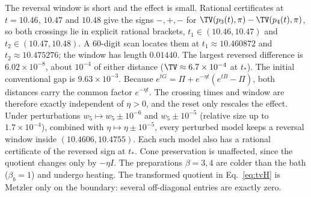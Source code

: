 The reversal window is short and the effect is small. Rational certificates at $t=10.46$, $10.47$ and $10.48$ give the signs $-,+,-$ for $\TV(p_3(t),\pi)-\TV(p_4(t),\pi)$, so both crossings lie in explicit rational brackets, $t_1\in(10.46,10.47)$ and $t_2\in(10.47,10.48)$. A 60-digit scan locates them at $t_1\approx10.460872$ and $t_2\approx10.475276$; the window has length $0.01440$. The largest reversed difference is $6.02\times10^{-8}$, about $10^{-4}$ of either distance ($\TV\approx6.7\times10^{-4}$ at $t_*$). The initial conventional gap is $9.63\times10^{-3}$. Because $e^{tG}=\Pi+e^{-\eta t}(e^{tB}-\Pi)$, both distances carry the common factor $e^{-\eta t}$. The crossing times and window are therefore exactly independent of $\eta>0$, and the reset only rescales the effect. Under perturbations $w_5\mapsto w_5\pm10^{-6}$ and $w_5\pm10^{-5}$ (relative size up to $1.7\times10^{-4}$), combined with $\eta\mapsto\eta\pm10^{-5}$, every perturbed model keeps a reversal window inside $(10.4606,10.4755)$. Each such model also has a rational certificate of the reversed sign at $t_*$. Cone preservation is unaffected, since the quotient changes only by $-\eta I$. The preparations $\beta=3,4$ are colder than the bath ($\beta_b=1$) and undergo heating. The transformed quotient in Eq.~\eqref{eq:tvH} is Metzler only on the boundary: several off-diagonal entries are exactly zero.
